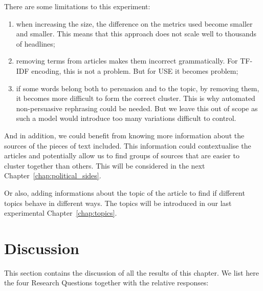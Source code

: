 
There are some limitations to this experiment:

\begin{enumerate}
    \item when increasing the size, the difference on the metrics used become smaller and smaller. This means that this approach does not scale well to thousands of headlines;
    \item removing terms from articles makes them incorrect grammatically. For TF-IDF encoding, this is not a problem. But for USE it becomes problem;
    \item if some words belong both to persuasion and to the topic, by removing them, it becomes more difficult to form the correct cluster. This is why automated non-persuasive rephrasing could be needed. But we leave this out of scope as such a model would introduce too many variations difficult to control. %
\end{enumerate}

And in addition, we could benefit from knowing more information about the sources of the pieces of text included. This information could contextualise the articles and potentially allow us to find groups of sources that are easier to cluster together than others. This will be considered in the next Chapter~\ref{chap:political_sides}.

Or also, adding informations about the topic of the article to find if different topics behave in different ways. The topics will be introduced in our last experimental Chapter~\ref{chap:topics}.

\section{\statusgreen Discussion}

This section contains the discussion of all the results of this chapter. We list here the four Research Questions together with the relative responses:

